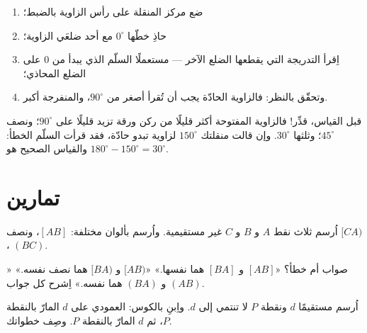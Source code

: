 \begin{method}\label{met:g6:lines:protractor}
\begin{enumerate}
  \item ضع مركز المنقلة على رأس الزاوية
        بالضبط؛
  \item حاذِ خطّها $0^\circ$ مع أحد ضلعَي الزاوية؛
  \item اِقرأ التدريجة التي يقطعها الضلع الآخر --- مستعملًا
        السلّم الذي يبدأ من $0$ على الضلع المحاذي؛
  \item وتحقّق بالنظر: فالزاوية الحادّة يجب أن تُقرأ أصغر من
        $90^\circ$، والمنفرجة أكبر.
\end{enumerate}
\end{method}

\begin{example}\label{ex:g6:lines:estimate}
قبل القياس، قدِّر! فالزاوية المفتوحة أكثر قليلًا من ركن
ورقة تزيد قليلًا على $90^\circ$؛ ونصف 
$45^\circ$؛ وثلثها $30^\circ$. وإن قالت منقلتك
$150^\circ$ لزاوية تبدو حادّة، فقد قرأت السلّم الخطأ:
والقياس الصحيح هو $180^\circ - 150^\circ = 30^\circ$.
\end{example}

\section{تمارين}

\begin{exercise}[$\star$]\label{exo:g6:lines:1}
اُرسم ثلاث نقط $A$ و $B$ و $C$ غير مستقيمية. واُرسم بألوان مختلفة:
 $[AB]$، ونصف  $[CA)$،  $(BC)$.
\end{exercise}

\begin{exercise}[$\star$]\label{exo:g6:lines:2}
صواب أم خطأ؟ «$[AB]$ و $[BA]$ هما  نفسها.»
«$[AB)$ و $[BA)$ هما نصف  نفسه.» «$(AB)$ و $(BA)$ هما
 نفسه.» اِشرح كل جواب.
\end{exercise}

\begin{exercise}[$\star$]\label{exo:g6:lines:3}
اُرسم مستقيمًا $d$ ونقطة $P$ لا تنتمي إلى $d$. واِبنِ بالكوس:
العمودي على $d$ المارّ بالنقطة $P$، ثم   $d$
المارّ بالنقطة $P$. وصِف خطواتك.
\end{exercise}

